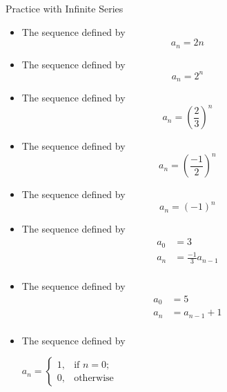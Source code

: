 \begin{exercise}{Practice with Infinite Series \Coffeecup \Coffeecup \Coffeecup}
\begin{itemize}
\item The sequence defined by $$a_n=2n$$
\vspace*{1.5in}
\item The sequence defined by $$a_n=2^n$$
\vspace*{1.5in}
\item The sequence defined by $$ a_n=\left(\frac{2}{3}\right)^n$$
\vspace*{1.5in}
\item The sequence defined by $$ a_n=\left(\frac{-1}{2}\right)^n$$
\vspace*{1.5in}
\item The sequence defined by $$ a_n=\left(-1\right)^n$$
\vspace*{1.5in}
\item The sequence defined by \begin{align*}
 a_0&=3 \\ 
 a_n&=\frac{-1}{3}a_{n-1} \\
\end{align*}
\vspace*{1.5in}
\item The sequence defined by \begin{align*}
 a_0&=5 \\ 
 a_n&=a_{n-1}+1 \\
\end{align*}
\vspace*{1.5in}
\item The sequence defined by \begin{center}
$a_n=\begin{cases}
1, & \text{if $n=0$;} \\
0, & \text{otherwise}
\end{cases}$
\end{center}
\vspace*{1.5in}
\end{itemize}
\end{exercise}